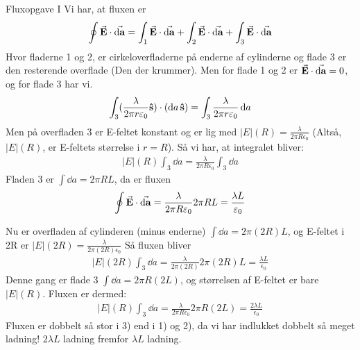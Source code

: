 \documentclass[crop=false, class=memoir]{standalone}
\begin{document}
\begin{opgave}{Fluxopgave I}
    \opg
    Vi har, at fluxen er
    \begin{align*}
    \oint\va{E}\cdot\va{\dd{a}}=\int_1\va{E}\cdot\va{\dd{a}}+\int_2\va{E}\cdot\va{\dd{a}}+\int_3\va{E}\cdot\va{\dd{a}}
    \end{align*}
    Hvor fladerne 1 og 2, er cirkeloverfladerne på enderne af cylinderne og flade 3 er den resterende overflade (Den der krummer). Men for flade 1 og 2 er $\va{E}\cdot\va{\dd{a}}=0$, og for flade 3 har vi.
    \begin{align}
        \int_3(\frac{\lambda}{2\pi r\varepsilon_0}\vu{s})\cdot(\dd{a}\vu{s})=\int_3\frac{\lambda}{2\pi r \varepsilon_0}\dd{a}
    \end{align}
    Men på overfladen 3 er E-feltet konstant og er lig med $|E|(R)=\frac{\lambda}{2\pi R\epsilon_0}$ (Altså, $|E|(R)$, er E-feltets størrelse i $r=R$). Så vi har, at integralet bliver:
    \begin{align*}
        |E|(R)\int_3\dd{a}=\frac{\lambda}{2\pi R\epsilon_0}\int_3\dd{a}
    \end{align*}
    Fladen 3 er $\int\dd{a}=2\pi R L$, da er fluxen
    \begin{align*}
        \oint\va{E}\cdot\va{\dd{a}}=\frac{\lambda}{2\pi R \varepsilon_0}2\pi RL=\frac{\lambda L}{\varepsilon_0}
    \end{align*}
    
    \opg
    Nu er overfladen af cylinderen (minus enderne) $\int\dd{a}=2\pi (2R)L$, og E-feltet i 2R er $|E|(2R)=\frac{\lambda}{2\pi(2R)\epsilon_0}$
    Så fluxen bliver
    \begin{align*}
        |E|(2R)\int_3\dd{a}=\frac{\lambda}{2\pi (2R)}2\pi (2R)L=\frac{\lambda L}{\epsilon_0}
    \end{align*}
    \opg
    Denne gang er flade 3 $\int\dd{a}=2\pi R(2L)$, og størrelsen af E-feltet er bare $|E|(R)$. Fluxen er dermed:
    \begin{align*}
        |E|(R)\int_3\dd{a}=\frac{\lambda}{2\pi R \epsilon_0}2\pi R (2L)=\frac{2\lambda L}{\epsilon_0}
    \end{align*}
    \opg Fluxen er dobbelt så stor i 3) end i 1) og 2), da vi har indlukket dobbelt så meget ladning! $2\lambda L$ ladning fremfor $\lambda L$ ladning.
\end{opgave}
\end{document}

